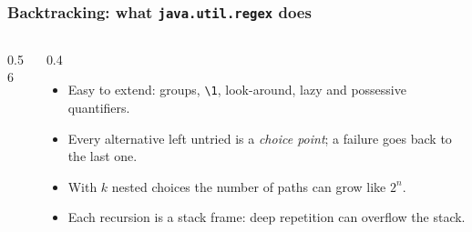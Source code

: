 \documentclass[aspectratio=169,10pt,compress]{beamer}
\begin{document}




\begin{frame}[t,fragile] \frametitle{Backtracking: what \texttt{java.util.regex} does}
  \begin{columns}[T]
    \begin{column}{0.56\textwidth}


\begin{algorithm}[H]
  \caption{Backtracking match}
\end{algorithm}

    \end{column}
    \begin{column}{0.4\textwidth}
      \begin{itemize}\small
        \item Easy to extend: groups, \texttt{\textbackslash 1}, look-around, lazy and possessive quantifiers.
        \item Every alternative left untried is a \emph{choice point}; a failure goes back to the last one.
        \item With $k$ nested choices the number of paths can grow like $2^{n}$.
        \item Each recursion is a stack frame: deep repetition can overflow the stack.
      \end{itemize}
    \end{column}
  \end{columns}
\end{frame}
\end{document}
